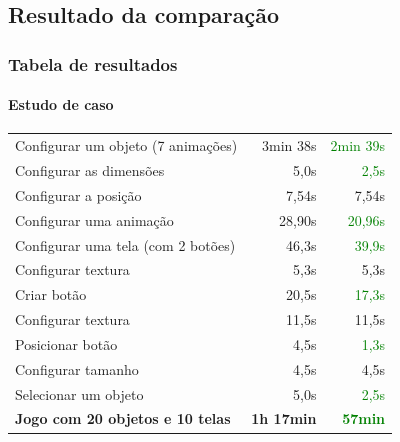 \documentclass[]{beamer}
\begin{document}
   \subsection{Resultado da comparação}
   \begin{frame}
      \frametitle{Tabela de resultados}
      \framesubtitle{Estudo de caso}
      \begin{center}
            \begin{tabular}{ m{16em} | r | r }
               Configurar um objeto (7 animações)      & 3min 38s & \textcolor{green}{2min 39s} \\
               \hspace{2em}Configurar as dimensões     & 5,0s     & \textcolor{green}{2,5s} \\
               \hspace{2em}Configurar a posição        & 7,54s    & 7,54s \\
               \hspace{2em}Configurar uma animação     & 28,90s   & \textcolor{green}{20,96s} \\
               Configurar uma tela (com 2 botões)      & 46,3s    & \textcolor{green}{39,9s} \\
               \hspace{2em}Configurar textura          & 5,3s     & 5,3s \\
               \hspace{2em}Criar botão                 & 20,5s    & \textcolor{green}{17,3s} \\
               \hspace{4em}Configurar textura          & 11,5s    & 11,5s \\
               \hspace{4em}Posicionar botão            & 4,5s     & \textcolor{green}{1,3s} \\
               \hspace{4em}Configurar tamanho          & 4,5s     & 4,5s \\
               Selecionar um objeto                    & 5,0s     & \textcolor{green}{2,5s} \\
               \hline
               \textbf{Jogo com 20 objetos e 10 telas} & \textbf{1h 17min} & \textbf{\textcolor{green}{57min}} \\
         \end{tabular}
      \end{center}
   \end{frame}
\end{document}
